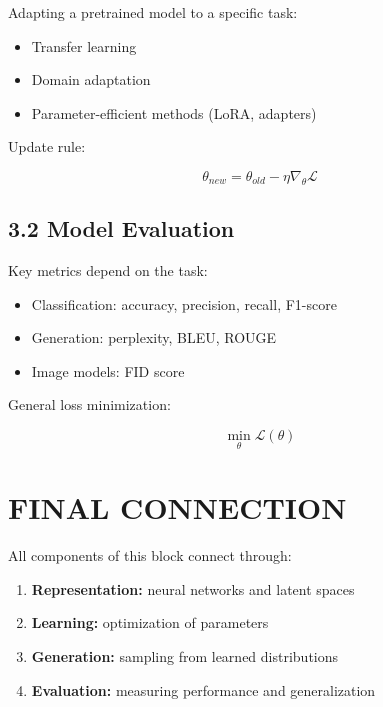 Adapting a pretrained model to a specific task:

\begin{itemize}
\item Transfer learning
\item Domain adaptation
\item Parameter-efficient methods (LoRA, adapters)
\end{itemize}

Update rule:

\[
\theta_{new} = \theta_{old} - \eta \nabla_\theta \mathcal{L}
\]

\vspace{0.3cm}

\subsection*{3.2 Model Evaluation}

Key metrics depend on the task:

\begin{itemize}
\item Classification: accuracy, precision, recall, F1-score
\item Generation: perplexity, BLEU, ROUGE
\item Image models: FID score
\end{itemize}

General loss minimization:

\[
\min_\theta \mathcal{L}(\theta)
\]

\vspace{0.5cm}

\section*{FINAL CONNECTION}

All components of this block connect through:

\begin{enumerate}
\item \textbf{Representation:} neural networks and latent spaces
\item \textbf{Learning:} optimization of parameters
\item \textbf{Generation:} sampling from learned distributions
\item \textbf{Evaluation:} measuring performance and generalization
\end{enumerate}

\vspace{0.5cm}

